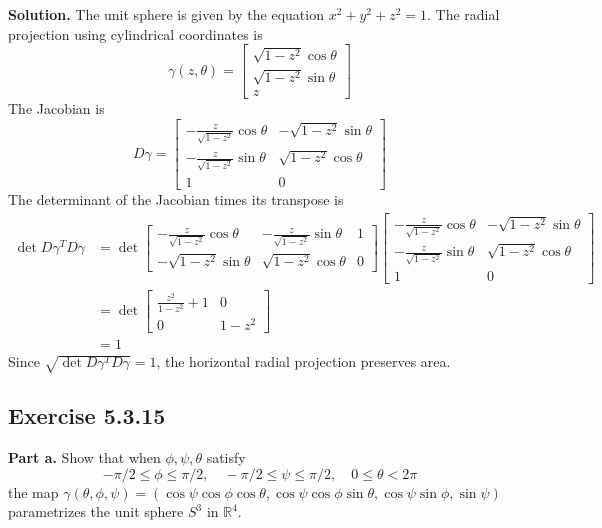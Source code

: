 \documentclass[12pt]{article}
\begin{document}
\textbf{Solution.}
The unit sphere is given by the equation $x^2 + y^2 + z^2 = 1$.
The radial projection using cylindrical coordinates is 
\[
  \gamma(z, \theta) = 
  \begin{bmatrix}
    \sqrt{1-z^2} \cos \theta \\
    \sqrt{1-z^2} \sin \theta\\
    z
  \end{bmatrix}
\]
The Jacobian is 
\[
  D\gamma = 
  \begin{bmatrix}
    -\frac{z}{\sqrt{1-z^2}} \cos \theta & -\sqrt{1-z^2} \sin \theta \\
    -\frac{z}{\sqrt{1-z^2}} \sin \theta & \sqrt{1-z^2} \cos \theta \\
    1 & 0
  \end{bmatrix}
\]
The determinant of the Jacobian times its transpose is 
\begin{align*}
  \det D\gamma^T D\gamma 
  &= \det \begin{bmatrix}
    -\frac{z}{\sqrt{1-z^2}} \cos \theta & -\frac{z}{\sqrt{1-z^2}} \sin \theta & 1 \\
    -\sqrt{1-z^2} \sin \theta & \sqrt{1-z^2} \cos \theta & 0
  \end{bmatrix}
  \begin{bmatrix}
    -\frac{z}{\sqrt{1-z^2}} \cos \theta & -\sqrt{1-z^2} \sin \theta \\
    -\frac{z}{\sqrt{1-z^2}} \sin \theta & \sqrt{1-z^2} \cos \theta \\
    1 & 0
  \end{bmatrix} \\
  &= \det \begin{bmatrix}
    \frac{z^2}{1-z^2} + 1 & 0 \\
    0 & 1-z^2
  \end{bmatrix} \\
  &= 1
\end{align*}
Since $\sqrt{\det D\gamma^T D\gamma} = 1$,
the horizontal radial projection preserves area.
\newpage





\subsection*{Exercise 5.3.15}
\textbf{Part a.}
Show that when $\phi,\psi,\theta$ satisfy
$$
-\pi/2\leq \phi\leq \pi/2,\quad -\pi/2\leq \psi\leq \pi/2,\quad 0\leq \theta<2\pi
$$
the map $\gamma(\theta,\phi,\psi) = (\cos \psi \cos \phi \cos \theta, \cos \psi \cos \phi \sin \theta, \cos \psi \sin\phi,\sin \psi)$ parametrizes the unit sphere $S^3$ in $\mathbb R^4$.
\medskip
\end{document}
